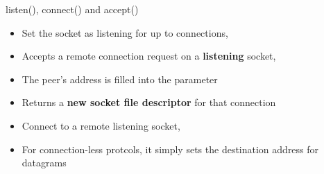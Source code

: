 \begin{frame}{listen(), connect() and accept()}

	\begin{itemize}
		\item Set the socket as listening for up to  connections, 
	\end{itemize}
	\vspace{0.5cm}
	\begin{itemize}
		\item Accepts a remote connection request on a \textbf{listening} socket, 
		\item The peer's address is filled into the  parameter
		\item Returns a \textbf{new socket file descriptor} for that connection
	\end{itemize}
	\vspace{0.5cm}
	\begin{itemize}
		\item Connect to a remote listening socket, 
		\item For connection-less protcols, it simply sets the destination address for datagrams
	\end{itemize}
\end{frame}

